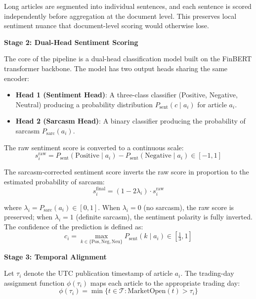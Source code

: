 Long articles are segmented into individual sentences, and each sentence is scored independently before aggregation at the document level. This preserves local sentiment nuance that document-level scoring would otherwise lose.

\textbf{Stage 2: Dual-Head Sentiment Scoring}

The core of the pipeline is a dual-head classification model built on the FinBERT transformer backbone. The model has two output heads sharing the same encoder:
\begin{itemize}
    \item \textbf{Head 1 (Sentiment Head)}: A three-class classifier (Positive, Negative, Neutral) producing a probability distribution $P_{\text{sent}}(c \mid a_i)$ for article $a_i$.
    \item \textbf{Head 2 (Sarcasm Head)}: A binary classifier producing the probability of sarcasm $P_{\text{sarc}}(a_i)$.
\end{itemize}

The raw sentiment score is converted to a continuous scale:
\begin{equation}
s_i^{\text{raw}} = P_{\text{sent}}(\text{Positive} \mid a_i) - P_{\text{sent}}(\text{Negative} \mid a_i) \in [-1, 1]
\end{equation}

The sarcasm-corrected sentiment score inverts the raw score in proportion to the estimated probability of sarcasm:
\begin{equation}
s_i^{\text{final}} = (1 - 2\lambda_i) \cdot s_i^{\text{raw}}
\end{equation}

where $\lambda_i = P_{\text{sarc}}(a_i) \in [0, 1]$. When $\lambda_i = 0$ (no sarcasm), the raw score is preserved; when $\lambda_i = 1$ (definite sarcasm), the sentiment polarity is fully inverted. The confidence of the prediction is defined as:
\begin{equation}
c_i = \max_{k \in \{\text{Pos}, \text{Neg}, \text{Neu}\}} P_{\text{sent}}(k \mid a_i) \in \left[\tfrac{1}{3}, 1\right]
\end{equation}

\textbf{Stage 3: Temporal Alignment}

Let $\tau_i$ denote the UTC publication timestamp of article $a_i$. The trading-day assignment function $\phi(\tau_i)$ maps each article to the appropriate trading day:
\begin{equation}
\phi(\tau_i) = \min\{t \in \mathcal{T} : \text{MarketOpen}(t) > \tau_i\}
\end{equation}

